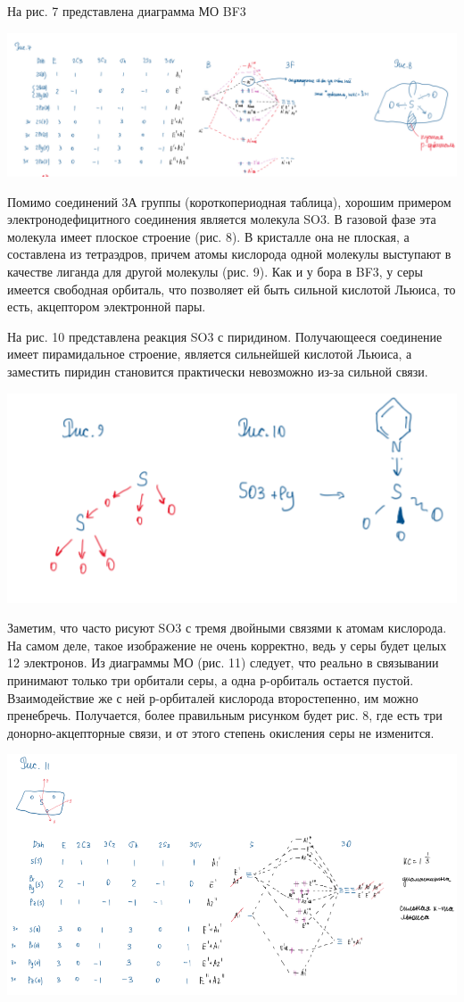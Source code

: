 На рис. 7 представлена диаграмма МО BF3

\includegraphics[scale=0.75]{images/16v2.png}

Помимо соединений 3А группы (короткопериодная таблица), хорошим примером электронодефицитного соединения является молекула SO3. В газовой фазе эта молекула имеет
плоское строение (рис. 8). В кристалле она не плоская, а составлена из тетраэдров, причем атомы кислорода одной молекулы выступают в качестве лиганда для другой молекулы
(рис. 9). Как и у бора в BF3, у серы имеется свободная орбиталь, что позволяет ей быть сильной кислотой Льюиса, то есть, акцептором электронной пары. 

На рис. 10 представлена реакция SO3 с пиридином. Получающееся соединение имеет пирамидальное строение, является сильнейшей кислотой Льюиса, а заместить пиридин
становится практически невозможно из-за сильной связи.

\includegraphics{images/16v3.png}

Заметим, что часто рисуют SO3 с тремя двойными связями к атомам кислорода. На самом деле, такое изображение не очень корректно, ведь у серы будет целых 12 электронов. Из
диаграммы МО (рис. 11) следует, что реально в связывании принимают только три орбитали серы, а одна р-орбиталь остается пустой. Взаимодействие же с ней р-орбиталей
кислорода второстепенно, им можно пренебречь. Получается, более правильным рисунком будет рис. 8, где есть три донорно-акцепторные связи, и от этого степень окисления серы
не изменится.

\includegraphics{images/16v4.png}